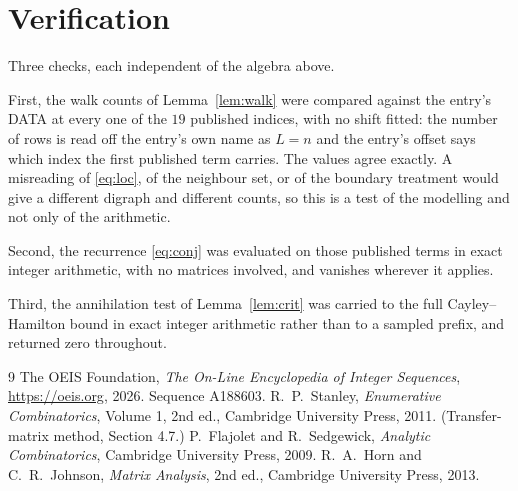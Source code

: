 \documentclass[11pt,a4paper]{article}
\theoremstyle{plain}
\theoremstyle{definition}
\begin{document}
\section{Verification}

Three checks, each independent of the algebra above.

First, the walk counts of Lemma~\ref{lem:walk} were compared against the entry's DATA at
every one of the $19$ published indices, with no shift fitted: the number of rows is
read off the entry's own name as $L=n$ and the entry's offset says which index the first
published term carries. The values agree exactly. A misreading of \eqref{eq:loc}, of the
neighbour set, or of the boundary treatment would give a different digraph and different
counts, so this is a test of the modelling and not only of the arithmetic.

Second, the recurrence \eqref{eq:conj} was evaluated on those published terms in exact
integer arithmetic, with no matrices involved, and vanishes wherever it applies.

Third, the annihilation test of Lemma~\ref{lem:crit} was carried to the full
Cayley--Hamilton bound in exact integer arithmetic rather than to a sampled prefix, and
returned zero throughout.

\begin{thebibliography}{9}
 The OEIS Foundation, \emph{The On-Line Encyclopedia of Integer
Sequences}, \url{https://oeis.org}, 2026. Sequence A188603.
 R.~P.~Stanley, \emph{Enumerative Combinatorics}, Volume 1, 2nd ed.,
Cambridge University Press, 2011. (Transfer-matrix method, Section 4.7.)
 P.~Flajolet and R.~Sedgewick, \emph{Analytic Combinatorics}, Cambridge
University Press, 2009.
 R.~A.~Horn and C.~R.~Johnson, \emph{Matrix Analysis}, 2nd ed., Cambridge
University Press, 2013.
\end{thebibliography}
\end{document}
